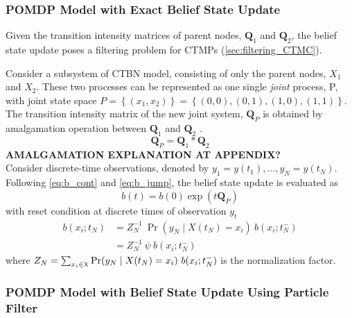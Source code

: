 \subsubsection{POMDP Model with Exact Belief State Update}
Given the transition intensity matrices of parent nodes, $ \textbf{Q}_1 $ and $ \textbf{Q}_2 $, the belief state update poses a filtering problem for CTMPs (\autoref{sec:filtering_CTMC}). 

Consider a subsystem of CTBN model, consisting of only the parent nodes, $ X_1 $ and $ X_2 $. These two processes can be represented as one single \textit{joint} process, P, with joint state space $ \textit{P} = \left\lbrace (x_1, x_2)\right\rbrace  = \left\lbrace (0,0), (0,1), (1,0), (1,1)\right\rbrace  $. The transition intensity matrix of the new joint system, $ \textbf{Q}_P $ is obtained by amalgamation operation between $ \textbf{Q}_{1} $ and  $ \textbf{Q}_{2} $ \cite{Nodelman1995}.
\begin{equation}
\textbf{Q}_P = \textbf{Q}_{1} * \textbf{Q}_{2}
\end{equation}
\textbf{AMALGAMATION EXPLANATION AT APPENDIX?}\\
Consider discrete-time observations, denoted by $ y_{1}=y(t_{1}), ..., y_{N}=y(t_{N}) $. Following \autoref{eq:b_cont} and \autoref{eq:b_jump}, the belief state update is evaluated as
\begin{equation}
b(t) = b(0) \exp(t\textbf{Q}_P)
\end{equation}
with reset condition at discrete times of observation $ y_{t} $ 
\begin{align}
b(x_{i}; t_{N}) &= Z_{N}^{-1}\ {\operatorname{Pr}(y_{N} \mid X(t_{N})=x_{i})}\ {b(x_{i}; t_{N}^{-})} \\ & = Z_{N}^{-1}\ \psi \ {b(x_{i}; t_{N}^{-})}
\end{align}
where $ Z_{N} = \sum_{x_{i}\in \rchi} \operatorname{Pr}(y_{N} \mid X(t_{N})=x_{i})\ b(x_{i}; t_{N}^{-}) $ is the normalization factor.

\subsubsection{POMDP Model with Belief State Update Using Particle Filter}

